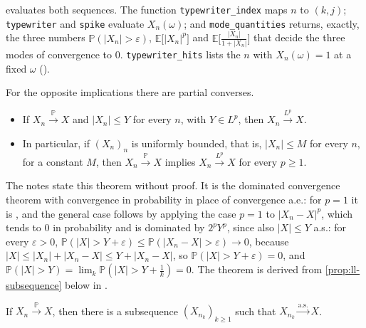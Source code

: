 \begin{remark}[computational]\label{rem:ll-code-counterexamples}
 evaluates both sequences. The function
\texttt{typewriter\_index} maps $n$ to $(k,j)$; \texttt{typewriter} and \texttt{spike}
evaluate $X_n(\omega)$; and \texttt{mode\_quantities} returns, exactly, the three numbers
$\mathbb P(|X_n|>\varepsilon)$,
$\mathbb E\big[|X_n|^p\big]$ and $\mathbb E\big[\frac{|X_n|}{1+|X_n|}\big]$ that decide the three
modes of convergence to $0$. \texttt{typewriter\_hits} lists the $n$ with $X_n(\omega)=1$ at a
fixed $\omega$ ().
\end{remark}


For the opposite implications there are partial converses.

\begin{theorem}\label{prop:ll-dominated}
\leavevmode
\begin{itemize}
  \item If $X_n\xrightarrow{\mathbb P}X$ and $|X_n|\le Y$ for every $n$, with $Y\in L^p$, then
    $X_n\xrightarrow{L^p}X$.
  \item In particular, if $(X_n)_n$ is uniformly bounded, that is,
    $|X_n|\le M$ for every $n$, for a constant $M$, then $X_n\xrightarrow{\mathbb P}X$ implies
    $X_n\xrightarrow{L^p}X$ for every $p\ge1$.
\end{itemize}
\end{theorem}

The notes state this theorem without proof. It is the dominated convergence theorem with
convergence in probability in place of convergence a.e.: for $p=1$ it is
\citet[Section~2.4, Exercise~34]{folland}, and the general case follows by applying the case
$p=1$ to $|X_n-X|^p$, which tends to $0$ in probability and is dominated by $2^pY^p$, since also
$|X|\le Y$ a.s.: for every $\varepsilon>0$,
$\mathbb P(|X|>Y+\varepsilon)\le\mathbb P(|X_n-X|>\varepsilon)\to0$, because $|X|\le|X_n|+|X_n-X|\le
Y+|X_n-X|$, so $\mathbb P(|X|>Y+\varepsilon)=0$, and $\mathbb P(|X|>Y)=\lim_k\mathbb
P(|X|>Y+\frac1k)=0$. The theorem is derived from \cref{prop:ll-subsequence} below in
.

\begin{theorem}\label{prop:ll-subsequence}
If $X_n\xrightarrow{\mathbb P}X$, then there is a subsequence $(X_{n_k})_{k\ge1}$ such that
$X_{n_k}\xrightarrow{\text{a.s.}}X$.
\end{theorem}

